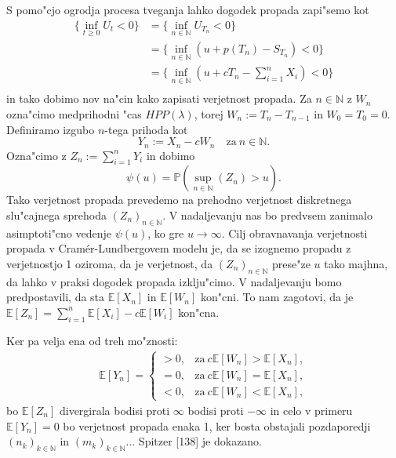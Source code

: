 \documentclass[12pt, a4paper, reqno]{amsart}
\theoremstyle{definition} %
\theoremstyle{plain} %
\newcommand{\N}{\mathbb{N}}
\newcommand{\E}{\mathbb{E}}
\newcommand{\Prob}{\mathbb{P}}
\newcommand{\1}{\mathds{1}}
\begin{document}
         S pomo"cjo ogrodja procesa tveganja lahko dogodek propada zapi"semo kot
        \begin{align*}
            \biggl\{\inf_{t\geq0}U_t<0\biggr\} &= \biggl\{\inf_{n\in\N}U_{T_n}<0\biggr\} \\
                          &= \biggl\{\inf_{n\in\N}\left(u + p(T_n) - S_{T_n}\right) < 0\biggr\} \\
                          &= \biggl\{\inf_{n\in\N}\left(u + cT_n - \sum_{i=1}^nX_i\right) < 0\biggr\} \\
        \end{align*}
        in tako dobimo nov na"cin kako zapisati verjetnost propada. Za $n\in\N$ z $W_n$ ozna"cimo 
        medprihodni "cas $HPP(\lambda)$, torej $W_n := T_n - T_{n-1}$ in $W_0 = T_0 = 0$. Definiramo 
        izgubo $n$-tega prihoda kot 
        \begin{equation*}
            Y_n := X_n - cW_n \quad \text{za} \ n\in\N.
        \end{equation*}
        Ozna"cimo z $Z_n := \sum_{i=1}^nY_i$ in dobimo
        \begin{equation*}
            \psi(u) = \Prob\left(\sup_{n\in\N}\left(Z_n\right) > u\right).
        \end{equation*}
        Tako verjetnost propada prevedemo na prehodno verjetnost diskretnega slu"cajnega 
        sprehoda $(Z_n)_{n\in\N}$. V nadaljevanju nas bo predvsem zanimalo asimptoti"cno 
        vedenje $\psi(u)$, ko gre $u\rightarrow\infty$. Cilj obravnavanja verjetnosti propada v 
        Cramér-Lundbergovem modelu je, da se izognemo 
        propadu z verjetnostjo 1 oziroma, da je verjetnost, da $(Z_n)_{n\in\N}$ prese"ze $u$
        tako majhna, da lahko v praksi dogodek propada izklju"cimo. V nadaljevanju bomo
        predpostavili, da sta $\E\left[X_n\right]$ in $\E\left[W_n\right]$ kon"cni. To nam 
        zagotovi, da je $\E\left[Z_n\right] = \sum_{i=1}^n\E\left[X_i\right] - c\E\left[W_i\right]$
        kon"cna.

        Ker pa velja ena od treh mo"znosti:
        \begin{align*}
            \E\left[Y_n\right] = 
            \begin{cases}
                > 0, & \text{za} \ c\E\left[W_n\right] > \E\left[X_n\right], \\
                = 0, & \text{za} \ c\E\left[W_n\right] = \E\left[X_n\right], \\
                < 0, & \text{za} \ c\E\left[W_n\right] < \E\left[X_n\right],
            \end{cases}
        \end{align*}
        bo $\E\left[Z_n\right]$ divergirala bodisi proti $\infty$ bodisi proti $-\infty$ in celo v 
        primeru $\E\left[Y_n\right] = 0$ bo verjetnost propada enaka 1, ker bosta obstajali 
        pozdaporedji $(n_k)_{k\in\N}$ in $(m_k)_{k\in\N}$... Spitzer [138] je dokazano.
\end{document}
